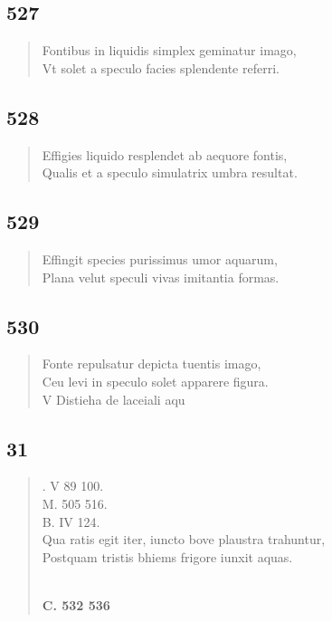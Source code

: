 \documentclass[11pt, a4paper]{report}
\begin{document}
            \subsection*{527}
      \begin{verse}
      Fontibus in liquidis simplex geminatur imago, \\ Vt solet a speculo facies splendente referri. \\ 
      \end{verse}
  
            \subsection*{528}
      \begin{verse}
      Effigies liquido resplendet ab aequore fontis, \\ Qualis et a speculo simulatrix umbra resultat. \\ 
      \end{verse}
  
            \subsection*{529}
      \begin{verse}
      Effingit species purissimus umor aquarum, \\ Plana velut speculi vivas imitantia formas. \\ 
      \end{verse}
  
            \subsection*{530}
      \begin{verse}
      Fonte repulsatur depicta tuentis imago, \\ Ceu levi in speculo solet apparere figura. \\ V Distieha de laceiali aqu \\ 
      \end{verse}
  
            \subsection*{31}
      \begin{verse}
      . V 89 100. \\ M. 505 516. \\ B. IV 124. \\ Qua ratis egit iter, iuncto bove plaustra trahuntur, \\ Postquam tristis bhiems frigore iunxit aquas. \\ 
        ﻿\pagebreak 
    \begin{center} \textbf{C. 532 536} \end{center} \marginpar{[67]} 
      \end{verse}
  
\end{document}
